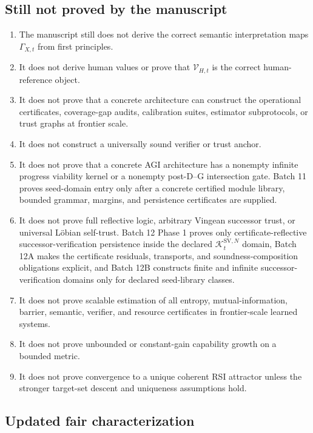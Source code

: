 \documentclass[11pt]{article}
\newcommand{\1}{\mathbf{1}}
\providecommand{\Kcal}{\mathcal{K}}
\providecommand{\Vcal}{\mathcal{V}}
\begin{document}
\subsection*{Still not proved by the manuscript}

\begin{enumerate}[label=(\arabic*)]
    \item The manuscript still does not derive the correct semantic interpretation maps \(\Gamma_{X,t}\) from first principles.
    \item It does not derive human values or prove that \(\Vcal_{H,t}\) is the correct human-reference object.
    \item It does not prove that a concrete architecture can construct the operational certificates, coverage-gap audits, calibration suites, estimator subprotocols, or trust graphs at frontier scale.
    \item It does not construct a universally sound verifier or trust anchor.
    \item It does not prove that a concrete AGI architecture has a nonempty infinite progress viability kernel or a nonempty post-D--G intersection gate. Batch 11 proves seed-domain entry only after a concrete certified module library, bounded grammar, margins, and persistence certificates are supplied.
    \item It does not prove full reflective logic, arbitrary Vingean successor trust, or universal L\"obian self-trust. Batch 12 Phase 1 proves only certificate-reflective successor-verification persistence inside the declared \(\Kcal_t^{\mathrm{SV},N}\) domain, Batch 12A makes the certificate residuals, transports, and soundness-composition obligations explicit, and Batch 12B constructs finite and infinite successor-verification domains only for declared seed-library classes.
    \item It does not prove scalable estimation of all entropy, mutual-information, barrier, semantic, verifier, and resource certificates in frontier-scale learned systems.
    \item It does not prove unbounded or constant-gain capability growth on a bounded metric.
    \item It does not prove convergence to a unique coherent RSI attractor unless the stronger target-set descent and uniqueness assumptions hold.
\end{enumerate}

\subsection*{Updated fair characterization}
\end{document}
